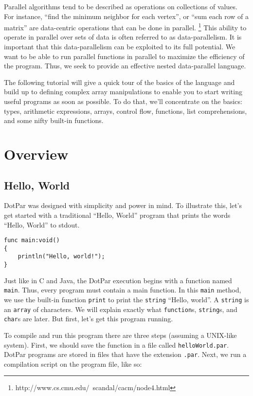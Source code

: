 Parallel algorithms tend to be described as operations on collections of values.
For instance, ``find the minimum neighbor for each vertex'', or ``sum each row
of a matrix'' are data-centric operations that can be done in parallel.
\footnote{http://www.cs.cmu.edu/~scandal/cacm/node4.html} This ability to
operate in parallel over sets of data is often referred to as data-parallelism.
It is important that this data-parallelism can be exploited to its full
potential. We want to be able to run parallel functions in parallel to maximize
the efficiency of the program. Thus, we seek to provide an effective nested
data-parallel language.

The following tutorial will give a quick tour of the basics of the language and
build up to defining complex array manipulations to enable you to start writing
useful programs as soon as possible. To do that, we'll concentrate on the
basics: types, arithmetic expressions, arrays, control flow, functions, list
comprehensions, and some nifty built-in functions.

\section{Overview}
\subsection{Hello, World}
DotPar was designed with simplicity and power in mind. To illustrate this, let's
get started with a traditional ``Hello, World'' program that prints the words
``Hello, World'' to stdout.

\begin{verbatim}
func main:void()
{
    println("Hello, world!");
}
\end{verbatim}

Just like in C and Java, the DotPar execution begins with a function named
\verb=main=. Thus, every program must contain a main function. In this
\verb=main= method, we use the built-in function \verb=print= to print the
\verb=string= ``Hello, world''. A \verb=string= is an \verb=array= of
characters. We will explain exactly what \verb=function=s, \verb=string=s, and
\verb=char=s are later. But first, let's get this program running.

To compile and run this program there are three steps (assuming a UNIX-like
system). First, we should save the function in a file called
\verb=helloWorld.par=. DotPar programs are stored in files that have the
extension \verb=.par=. Next, we run a compilation script on the program file,
like so:

